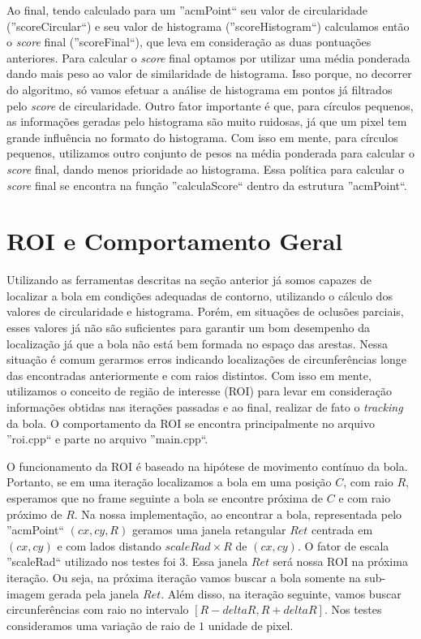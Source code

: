 \documentclass[11pt,a4paper]{article}
\begin{document}
 Ao final, tendo calculado para um ''acmPoint`` seu valor de circularidade (''scoreCircular``) e seu valor de histograma (''scoreHistogram``) calculamos então o \textit{score} final (''scoreFinal``), que leva em consideração as duas pontuações anteriores. Para calcular o \textit{score} final optamos por utilizar uma média ponderada dando mais peso ao valor de similaridade de histograma. Isso porque, no decorrer do algoritmo, só vamos efetuar a análise de histograma em pontos já filtrados pelo \textit{score} de circularidade. Outro fator importante é que, para círculos pequenos, as informações geradas pelo histograma são muito ruidosas, já que um pixel tem grande influência no formato do histograma. Com isso em mente, para círculos pequenos, utilizamos outro conjunto de pesos na média ponderada para calcular o \textit{score} final, dando menos prioridade ao histograma. Essa política para calcular o \textit{score} final se encontra na função ''calculaScore`` dentro da estrutura ''acmPoint``.

\section{ROI e Comportamento Geral}

 Utilizando as ferramentas descritas na seção anterior já somos capazes de localizar a bola em condições adequadas de contorno, utilizando o cálculo dos valores de circularidade e histograma. Porém, em situações de oclusões parciais, esses valores já não são suficientes para garantir um bom desempenho da localização já que a bola não está bem formada no espaço das arestas. Nessa situação é comum gerarmos erros indicando localizações de circunferências longe das encontradas anteriormente e com raios distintos. Com isso em mente, utilizamos o conceito de região de interesse (ROI) para levar em consideração informações obtidas nas iterações passadas e ao final, realizar de fato o \textit{tracking} da bola. O comportamento da ROI se encontra principalmente no arquivo ''roi.cpp`` e parte no arquivo ''main.cpp``.

 O funcionamento da ROI é baseado na hipótese de movimento contínuo da bola. Portanto, se em uma iteração localizamos a bola em uma posição $C$, com raio $R$, esperamos que no frame seguinte a bola se encontre próxima de $C$ e com raio próximo de $R$. Na nossa implementação, ao encontrar a bola, representada pelo ''acmPoint`` $(cx,cy,R)$ geramos uma janela retangular $Ret$ centrada em $(cx,cy)$ e com lados distando $scaleRad\times R$ de $(cx,cy)$. O fator de escala ''scaleRad`` utilizado nos testes foi $3$. Essa janela $Ret$ será nossa ROI na próxima iteração. Ou seja, na próxima iteração vamos buscar a bola somente na sub-imagem gerada pela janela $Ret$. Além disso, na iteração seguinte, vamos buscar circunferências com raio no intervalo $[R-deltaR,R+deltaR]$. Nos testes consideramos uma variação de raio de $1$ unidade de pixel.
\end{document}
